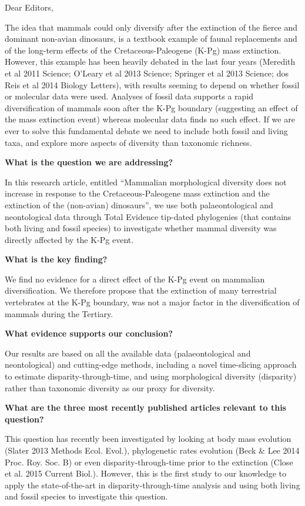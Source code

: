 \documentclass[11pt]{letter}
\begin{document}
\begin{letter}{}
\opening{Dear Editors,}

The idea that mammals could only diversify after the extinction of the fierce and dominant non-avian dinosaurs, is a textbook example of faunal replacements and of the long-term effects of the Cretaceous-Paleogene (K-Pg) mass extinction.
However, this example has been heavily debated in the last four years (Meredith et al 2011 Science; O'Leary et al 2013 Science; Springer et al 2013 Science; dos Reis et al 2014 Biology Letters), with results seeming to depend on whether fossil or molecular data were used.
Analyses of fossil data supports a rapid diversification of mammals soon after the K-Pg boundary (suggesting an effect of the mass extinction event) whereas molecular data finds no such effect.
If we are ever to solve this fundamental debate we need to include both fossil and living taxa, and explore more aspects of diversity than taxonomic richness.

\textbf{What is the question we are addressing?}

In this research article, entitled ``Mammalian morphological diversity does not increase in response to the Cretaceous-Paleogene mass extinction and the extinction of the (non-avian) dinosaurs'', we use both palaeontological and neontological data through Total Evidence tip-dated phylogenies (that contains both living and fossil species) to investigate whether mammal diversity was directly affected by the K-Pg event.

\textbf{What is the key finding?}

We find no evidence for a direct effect of the K-Pg event on mammalian diversification.
We therefore propose that the extinction of many terrestrial vertebrates at the K-Pg boundary, was not a major factor in the diversification of mammals during the Tertiary. 

\textbf{What evidence supports our conclusion?}

Our results are based on all the available data (palaeontological and neontological) and cutting-edge methods, including a novel time-slicing approach to estimate disparity-through-time, and using morphological diversity (disparity) rather than taxonomic diversity as our proxy for diversity.

\textbf{What are the three most recently published articles relevant to this question?}

This question has recently been investigated by looking at body mass evolution (Slater 2013 Methods Ecol. Evol.), phylogenetic rates evolution (Beck \& Lee 2014 Proc. Roy. Soc. B) or even disparity-through-time prior to the extinction (Close et al. 2015 Current Biol.).
However, this is the first study to our knowledge to apply the state-of-the-art in disparity-through-time analysis and using both living and fossil species to investigate this question.


\end{letter}
\end{document}
